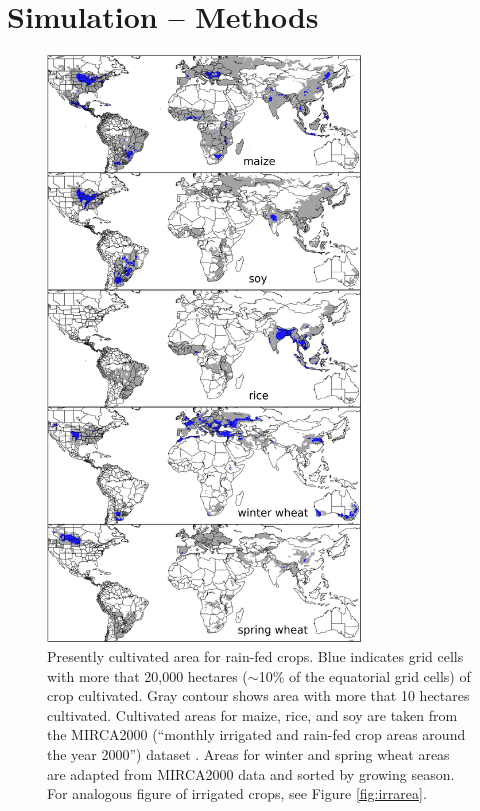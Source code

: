\documentclass[esd, final]{copernicus} %
\begin{document}
\section{Simulation -- Methods}
\label{S:2}

\begin{figure}[h]
\centering
   \includegraphics[width=8.3cm]{figures/croparea.png}
   \caption{Presently cultivated area for rain-fed crops. Blue indicates grid cells with more that 20,000 hectares ($\sim$10\% of the equatorial grid cells) of crop cultivated. Gray contour shows area with more that 10 hectares cultivated. Cultivated areas for maize, rice, and soy are taken from the MIRCA2000 (``monthly irrigated and rain-fed crop areas around the year 2000'') dataset \citep{Portmann2010}. Areas for winter and spring wheat areas are adapted from MIRCA2000 data and sorted by growing season. For analogous figure of irrigated crops, see Figure \ref{fig:irrarea}.}
   \label{fig:crop_area}
\end{figure}
\end{document}
